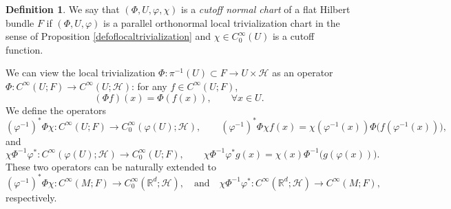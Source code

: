 \documentclass[11pt,oneside,reqno]{amsart}
\theoremstyle{definition}
\newtheorem{definition}{Definition}[section]
\numberwithin{equation}{section}
\theoremstyle{plain}
\begin{document}
\begin{definition}\label{defofcutofflocaltrivialization}
We say that $(\Phi,U,\varphi,\chi)$ is a \textit{cutoff normal chart} of a flat Hilbert bundle $F$ if $(\Phi,U,\varphi)$ is a parallel orthonormal local trivialization chart in the sense of Proposition \ref{defoflocaltrivialization} and $\chi\in C_{0}^{\infty}(U)$ is a cutoff function. 

\end{definition}

We can view the local trivialization $\Phi:\pi^{-1}(U)  \subset F \rightarrow U \times \mathcal{H}$ as an operator $\Phi:C^\infty(U;F)\rightarrow C^\infty(U ;\mathcal{H})$: for any $f \in C^\infty(U;F)$, 
\begin{equation*}
     (\Phi f)(x) = \Phi (f(x)), \qquad \forall x\in U.
\end{equation*}
We define the operators
\begin{equation*}
    (\varphi^{-1})^*\Phi \chi :C^\infty(U;F) \rightarrow C_0^\infty(\varphi(U);\mathcal{H}), \qquad (\varphi^{-1})^* \Phi \chi f(x)= \chi(\varphi^{-1}(x)) \Phi\big( f(\varphi^{-1}(x)) \big),
\end{equation*}
and
\begin{equation*}
    \chi \Phi^{-1} \varphi^*:C^\infty(\varphi(U);\mathcal{H}) \rightarrow C_0^\infty(U;F), \qquad \chi \Phi^{-1} \varphi^* g(x)= \chi(x) \Phi^{-1}\big( g(\varphi(x)) \big).
\end{equation*}
These two operators can be naturally extended to
\begin{equation}\label{cutoffoperator}
    (\varphi^{-1})^* \Phi \chi: C^{\infty}(M;F)\to C_{0}^{\infty}(\mathbb{R}^d;\mathcal{H}), \quad \mathrm{and} \quad \chi \Phi^{-1} \varphi^*: C^{\infty}(\mathbb{R}^d;\mathcal{H})\to C^{\infty}(M;F ),
\end{equation}
respectively. 
\end{document}

